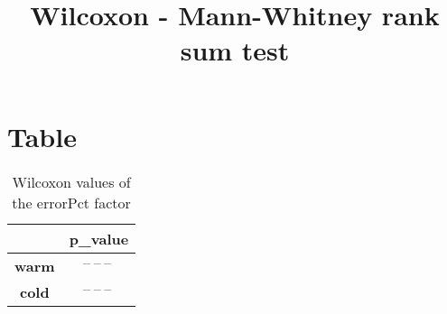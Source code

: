 \documentclass{article}
\title{Wilcoxon - Mann-Whitney rank sum test}
\author{}
\begin{document}
\maketitle
\section{Table}
\begin{table}[!htp]
  \caption{Wilcoxon values of the errorPct factor}
  \label{table:errorPct}
  \centering
  \begin{scriptsize}
  \begin{tabular}{c|c}
      & \textbf{p\_value} \\\hline
      \textbf{warm} & $\text{--}\ \text{--}\ \text{--}\ $ \\
      \textbf{cold} & $\text{--}\ \text{--}\ \text{--}\ $ \\
  \end{tabular}
  \end{scriptsize}
\end{table}
\end{document}
